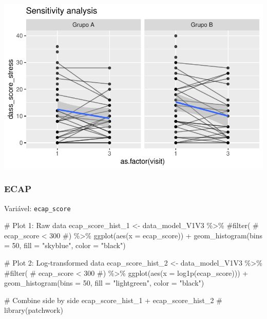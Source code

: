 \documentclass[
  letterpaper,
  DIV=11,
  numbers=noendperiod]{scrartcl}
\newenvironment{Shaded}{\begin{snugshade}}{\end{snugshade}}
\newcommand{\AttributeTok}[1]{\textcolor[rgb]{0.40,0.45,0.13}{#1}}
\newcommand{\CommentTok}[1]{\textcolor[rgb]{0.37,0.37,0.37}{#1}}
\newcommand{\DecValTok}[1]{\textcolor[rgb]{0.68,0.00,0.00}{#1}}
\newcommand{\FunctionTok}[1]{\textcolor[rgb]{0.28,0.35,0.67}{#1}}
\newcommand{\NormalTok}[1]{\textcolor[rgb]{0.00,0.23,0.31}{#1}}
\newcommand{\OtherTok}[1]{\textcolor[rgb]{0.00,0.23,0.31}{#1}}
\newcommand{\SpecialCharTok}[1]{\textcolor[rgb]{0.37,0.37,0.37}{#1}}
\newcommand{\StringTok}[1]{\textcolor[rgb]{0.13,0.47,0.30}{#1}}
\begin{document}
\includegraphics{Outcomes_V1V2V3_files/figure-pdf/dass_score_stress_6-2.pdf}

\subsubsection{ECAP}\label{ecap}

Variável: \texttt{ecap\_score}

\begin{Shaded}
\begin{Highlighting}[]
\CommentTok{\# Plot 1: Raw data}
\NormalTok{ecap\_score\_hist\_1 }\OtherTok{\textless{}{-}}\NormalTok{ data\_model\_V1V3 }\SpecialCharTok{\%\textgreater{}\%} 
    \CommentTok{\#filter(}
    \CommentTok{\#    ecap\_score \textless{} 300}
    \CommentTok{\#) \%\textgreater{}\% }
    \FunctionTok{ggplot}\NormalTok{(}\FunctionTok{aes}\NormalTok{(}\AttributeTok{x =}\NormalTok{ ecap\_score)) }\SpecialCharTok{+} 
    \FunctionTok{geom\_histogram}\NormalTok{(}\AttributeTok{bins =} \DecValTok{50}\NormalTok{, }\AttributeTok{fill =} \StringTok{"skyblue"}\NormalTok{, }\AttributeTok{color =} \StringTok{"black"}\NormalTok{)}

\CommentTok{\# Plot 2: Log{-}transformed data}
\NormalTok{ecap\_score\_hist\_2 }\OtherTok{\textless{}{-}}\NormalTok{ data\_model\_V1V3 }\SpecialCharTok{\%\textgreater{}\%} 
    \CommentTok{\#filter(}
    \CommentTok{\#    ecap\_score \textless{} 300}
    \CommentTok{\#) \%\textgreater{}\%}
    \FunctionTok{ggplot}\NormalTok{(}\FunctionTok{aes}\NormalTok{(}\AttributeTok{x =} \FunctionTok{log1p}\NormalTok{(ecap\_score))) }\SpecialCharTok{+} 
    \FunctionTok{geom\_histogram}\NormalTok{(}\AttributeTok{bins =} \DecValTok{50}\NormalTok{, }\AttributeTok{fill =} \StringTok{"lightgreen"}\NormalTok{, }\AttributeTok{color =} \StringTok{"black"}\NormalTok{)}

\CommentTok{\# Combine side by side}
\NormalTok{ecap\_score\_hist\_1 }\SpecialCharTok{+}\NormalTok{ ecap\_score\_hist\_2 }\CommentTok{\# library(patchwork)}
\end{Highlighting}
\end{Shaded}
\end{document}
